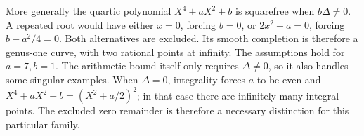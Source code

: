More generally the quartic polynomial $X^4+aX^2+b$ is squarefree when
$b\Delta\neq0$.  A repeated root would have either $x=0$, forcing $b=0$,
or $2x^2+a=0$, forcing $b-a^2/4=0$.  Both alternatives are excluded.
Its smooth completion is therefore a genus-one curve, with two rational
points at infinity.  The assumptions hold for $a=7,b=1$.
The arithmetic bound itself only requires $\Delta\neq0$, so it also
handles some singular examples.  When $\Delta=0$, integrality forces $a$
to be even and
$X^4+aX^2+b=(X^2+a/2)^2$; in that case there are infinitely many integral
points.  The excluded zero remainder is therefore a necessary distinction
for this particular family.

